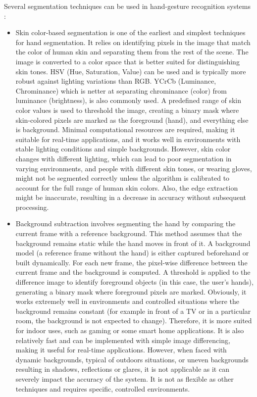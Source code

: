 \documentclass[12pt]{article}
\begin{document}
Several segmentation techniques can be used in hand-gesture recognition systems :
\begin{itemize}
  \item Skin color-based segmentation is one of the earliest and simplest techniques for hand segmentation. It relies on identifying pixels in the image that match the color of human skin and separating them from the rest of the scene. The image is converted to a color space that is better suited for distinguishing skin tones. HSV (Hue, Saturation, Value) can be used and is typically more robust against lighting variations than RGB. YCrCb (Luminance, Chrominance) which is netter at separating chrominance (color) from luminance (brightness), is also commonly used. A predefined range of skin color values is used to threshold the image, creating a binary mask where skin-colored pixels are marked as the foreground (hand), and everything else is background. Minimal computational resources are required, making it suitable for real-time applications, and it works well in environments with stable lighting conditions and simple backgrounds. However, skin color changes with different lighting, which can lead to poor segmentation in varying environments, and people with different skin tones, or wearing gloves, might not be segmented correctly unless the algorithm is calibrated to account for the full range of human skin colors. Also, the edge extraction might be inaccurate, resulting in a decrease in accuracy without subsequent processing.
  \item Background subtraction involves segmenting the hand by comparing the current frame with a reference background. This method assumes that the background remains static while the hand moves in front of it. A background model (a reference frame without the hand) is either captured beforehand or built dynamically. For each new frame, the pixel-wise difference between the current frame and the background is computed. A threshold is applied to the difference image to identify foreground objects (in this case, the user's hands), generating a binary mask where foreground pixels are marked. Obviously, it works extremely well in environments and controlled situations where the background remains constant (for example in front of a TV or in a particular room, the background is not expected to change). Therefore, it is more suited for indoor uses, such as gaming or some smart home applications. It is also relatively fast and can be implemented with simple image differencing, making it useful for real-time applications. However, when faced with dynamic backgrounds, typical of outdoors situations, or uneven backgrounds resulting in shadows, reflections or glares, it is not applicable as it can severely impact the accuracy of the system. It is not as flexible as other techniques and requires specific, controlled environments.

\end{itemize}
\end{document}
